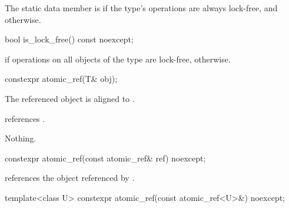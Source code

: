 \begin{itemdescr}
\pnum
The static data member  is 
if the  type's operations are always lock-free,
and  otherwise.
\end{itemdescr}

%
%
%
%
\begin{itemdecl}
bool is_lock_free() const noexcept;
\end{itemdecl}

\begin{itemdescr}
\pnum
\returns
{} if operations on all objects of the type 
are lock-free,
 otherwise.
\end{itemdescr}

%
%
%
%
\begin{itemdecl}
constexpr atomic_ref(T& obj);
\end{itemdecl}

\begin{itemdescr}
\pnum
\expects
The referenced object is aligned to .

\pnum
\ensures
{} references .

\pnum
\throws
Nothing.
\end{itemdescr}

%
%
%
%
\begin{itemdecl}
constexpr atomic_ref(const atomic_ref& ref) noexcept;
\end{itemdecl}

\begin{itemdescr}
\pnum
\ensures
{} references the object referenced by .
\end{itemdescr}

\begin{itemdecl}
template<class U>
  constexpr atomic_ref(const atomic_ref<U>&) noexcept;
\end{itemdecl}

